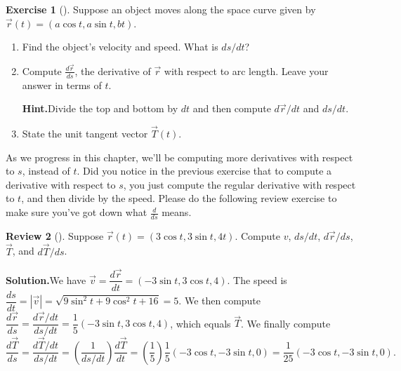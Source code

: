 \documentclass[10pt,]{book}
\theoremstyle{plain}
\theoremstyle{definition}
\theoremstyle{definition}
\theoremstyle{definition}
\newtheorem{project}{Review}[section]
\theoremstyle{definition}
\newtheorem{exploration}[project]{Exercise}
\theoremstyle{definition}
\numberwithin{equation}{section}
\begin{document}
\begin{exploration}[]\label{exploration-167}
Suppose an object moves along the space curve given by \(\vec r(t)=(a\cos t,a\sin t,b t)\).%
\begin{enumerate}[font=\bfseries,label=(\alph*),ref=\alph*]
\item\label{task-398} Find the object's velocity and speed. What is \(ds/dt\)?%
\item\label{task-399} Compute \(\frac{d\vec r}{ds}\), the derivative of \(\vec r\) with respect to arc length. Leave your answer in terms of \(t\).%
\par\medskip\noindent%
\textbf{Hint.}\quad Divide the top and bottom by \(dt\) and then compute \(d\vec r/dt\) and \(ds/dt\).%
\item\label{task-400} State the unit tangent vector \(\vec T(t)\).%
\end{enumerate}
\end{exploration}
As we progress in this chapter, we'll be computing more derivatives with respect to \(s\), instead of \(t\). Did you notice in the previous exercise that to compute a derivative with respect to \(s\), you just compute the regular derivative with respect to \(t\), and then divide by the speed. Please do the following review exercise to make sure you've got down what \(\frac{d}{ds}\) means.%
\begin{project}[]\label{project-11}
Suppose \(\vec r(t)=(3\cos t,3\sin t,4t)\). Compute \(v\), \(ds/dt\), \(d\vec r/ds\), \(\vec T\), and \(d\vec T/ds\).%
\par\medskip\noindent%
\textbf{Solution.}\quad We have \(\vec v = \dfrac{d\vec r}{dt} = (-3\sin t, 3\cos t, 4)\). The speed is \(\dfrac{ds}{dt}=|\vec v| = \sqrt{9\sin^2t+9\cos^2t+16}=5\). We then compute \(\dfrac{d\vec r}{ds}=\dfrac{d\vec r/dt}{ds/dt} = \dfrac{1}{5}(-3\sin t, 3\cos t, 4)\), which equals \(\vec T\). We finally compute%
\begin{equation*}
\dfrac{d\vec T}{ds}=\dfrac{d\vec T/dt}{ds/dt}=\left(\dfrac{1}{ds/dt}\right)\dfrac{d\vec T}{dt} = \left(\dfrac{1}{5}\right)\dfrac{1}{5}(-3\cos t, -3\sin t, 0) =  \dfrac{1}{25}(-3\cos t, -3\sin t, 0).
\end{equation*}
%
\end{project}
\typeout{************************************************}
\typeout{************************************************}
\end{document}
